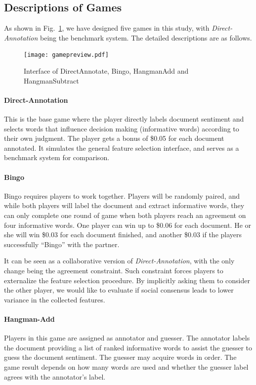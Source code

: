 \documentclass[chi_draft]{sigchi}
\begin{document}
\subsection{Descriptions of Games}
As shown in Fig.~\ref{fig:game-interface}, we have designed five games in this study, with \emph{Direct-Annotation} being the benchmark system. 
The detailed descriptions are as follows.
 
\begin{figure}[t]
\texttt{[image: gamepreview.pdf]}
\caption{Interface of DirectAnnotate, Bingo, HangmanAdd and HangmanSubtract}
\label{fig:game-interface}
\end{figure}

\paragraph{Direct-Annotation} 
This is the base game where the player directly labels document sentiment and selects words that influence decision making (informative words) according to their own judgment. The player gets a bonus of \$0.05 for each document annotated. It simulates the general feature selection interface, and serves as a benchmark system for comparison. 

\paragraph{Bingo} 
Bingo requires players to work together. Players will be randomly paired, and while both players will label the document and extract informative words, they can only complete one round of game when both players reach an agreement on four informative words.
One player can win up to \$0.06 for each document.
He or she will win \$0.03 for each document finished, and another \$0.03 if the players successfully ``Bingo'' with the partner.

It can be seen as a collaborative version of \emph{Direct-Annotation}, with the only change being the agreement constraint. 
Such constraint forces players to externalize the feature selection procedure. 
By implicitly asking them to consider the other player, we would like to evaluate if social consensus leads to lower variance in the collected features.

\paragraph{Hangman-Add} 
Players in this game are assigned as annotator and guesser. The annotator labels the document providing a list of ranked informative words to assist the guesser to guess the document sentiment. The guesser may acquire words in order. The game result depends on how many words are used and whether the guesser label agrees with the annotator's label.
\end{document}
